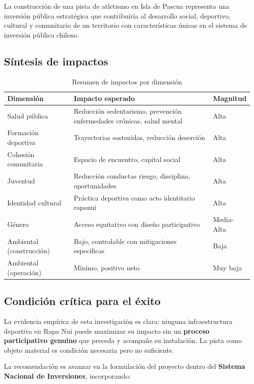 \documentclass[12pt, a4paper]{article}
\begin{document}
La construcción de una pista de atletismo en Isla de Pascua representa una inversión
pública estratégica que contribuiría al desarrollo social, deportivo, cultural y
comunitario de un territorio con características únicas en el sistema de inversión
pública chileno.

\subsection{Síntesis de impactos}

\begin{table}[h!]
\centering
\begin{tabularx}{\linewidth}{lXl}
\toprule
\textbf{Dimensión} & \textbf{Impacto esperado} & \textbf{Magnitud} \\
\midrule
Salud pública & Reducción sedentarismo, prevención enfermedades crónicas, salud mental & Alta \\
Formación deportiva & Trayectorias sostenidas, reducción deserción & Alta \\
Cohesión comunitaria & Espacio de encuentro, capital social & Alta \\
Juventud & Reducción conductas riesgo, disciplina, oportunidades & Alta \\
Identidad cultural & Práctica deportiva como acto identitario rapanui & Alta \\
Género & Acceso equitativo con diseño participativo & Media-Alta \\
Ambiental (construcción) & Bajo, controlable con mitigaciones específicas & Baja \\
Ambiental (operación) & Mínimo, positivo neto & Muy baja \\
\bottomrule
\end{tabularx}
\caption{Resumen de impactos por dimensión}
\end{table}

\subsection{Condición crítica para el éxito}

La evidencia empírica de esta investigación es clara: ninguna infraestructura
deportiva en Rapa Nui puede maximizar su impacto sin un \textbf{proceso participativo
genuino} que preceda y acompañe su instalación. La pista como objeto material es
condición necesaria pero no suficiente.

La recomendación es avanzar en la formulación del proyecto dentro del
\textbf{Sistema Nacional de Inversiones}, incorporando:
\end{document}
